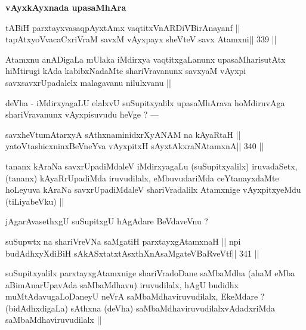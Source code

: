 \begin{center}
{\bf vAyxkAyxnada upasaMhAra}
\end{center}

\begin{shl}
tABiH parxtayxvasaqpAyx\s\s tAmx vaqtitxVnARDiVBirAnayanf ||
\footnotemark[1]tapAtxyoVvacaCxriVraM savxM vAyxpayx sheVteV savx Atamxni\hfill || 339 ||
\end{shl}

\begin{artha}
Atamxnu anADigaLa mUlaka iMdirxya vaqtitxgaLanunx upasaMharisutAtx hiMtirugi kAda kabibxNadaMte shariVravanunx savxyaM vAyxpi savxsavxrUpadalelx malagavanu nilulxvanu ||
\end{artha}

\begin{artha}
deVha - iMdirxyagaLU elalxvU suSupitxyalilx upasaMhArava hoMdiruvAga shariVravanunx vAyxpisuvudu heVge ? ---
\end{artha}

\begin{shl}
savxheVtumAtarxyA sAthxnaminidxrXyANAM na kAyaRtaH ||
yatoV\s tashicxninxBeVneYva vAyxpitxH sAyxtAkxraNAtamxnA\hfill || 340 ||
\end{shl}

\begin{artha}
tananx kAraNa savxrUpadiMdaleV iMdirxyagaLu (suSupitxyalilx) iruvadaSetx, (tananx) kAyaRrUpadiMda iruvudilalx, eMbuvudariMda ceYtanayxdaMte hoLeyuva kAraNa savxrUpadiMdaleV shariVradalilx Atamxnige vAyxpitxyeMdu (tiLiyabeVku) ||
\end{artha}

\begin{artha}
jAgarAvasethxgU suSupitxgU hAgAdare BeVdaveVnu ?
\end{artha}

\begin{shl}
suSupwtx na shariVreVNa saMgatiH parxtayxgAtamxnaH ||
npi budAdhxyXdiBiH sAkASxtatxtAsxthXnAsaMgateVBaRveVtf\hfill || 341 ||
\end{shl}

\begin{artha}
suSupitxyalilx parxtayxgAtamxnige shariVradoDane saMbaMdha (ahaM eMba aBimAnarUpavAda saMbaMdhavu) iruvudilalx, hAgU budidhx muMtAdavugaLoDaneyU neVrA saMbaMdhaviruvudilalx, EkeMdare ? (bidAdhxdigaLa) sAthxna (deVha) saMbaMdhaviruvudilalxvAdadxriMda saMbaMdhaviruvudilalx ||
\end{artha}

